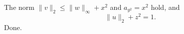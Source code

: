 \documentclass{article}
\newcommand{\norm}[2][2]{\|#2\|_{#1}}
\newcommand{\sq}[1][x]{#1^2}
\begin{document}
The norm $\norm{v} \le \norm[\infty]{w}+\sq$ and $a_{\sq[y]} = {\sq}$ hold, and
\[ \norm{u} + \sq[z] = 1. \]
Done.
\end{document}

